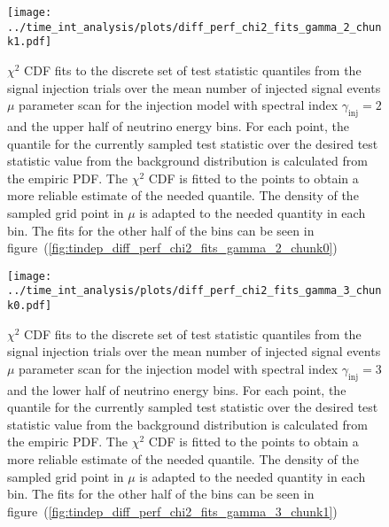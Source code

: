 \begin{figure}[H]
  \centering
  \texttt{[image: ../time\_int\_analysis/plots/diff\_perf\_chi2\_fits\_gamma\_2\_chunk1.pdf]}
  \caption[$\chi^2$ CDF fits for the time-integrated diff. performance, $\gamma_\text{inj}=2$ -- part 2]{
     $\chi^2$ CDF fits to the discrete set of test statistic quantiles from the signal injection trials over the mean number of injected signal events $\mu$ parameter scan for the injection model with spectral index $\gamma_\text{inj}=2$ and the upper half of neutrino energy bins.
     For each point, the quantile for the currently sampled test statistic over the desired test statistic value from the background distribution is calculated from the empiric PDF.
     The $\chi^2$ CDF is fitted to the points to obtain a more reliable estimate of the needed quantile.
     The density of the sampled grid point in $\mu$ is adapted to the needed quantity in each bin.
     The fits for the other half of the bins can be seen in figure~(\ref{fig:tindep_diff_perf_chi2_fits_gamma_2_chunk0})
  }
  \label{fig:tindep_diff_perf_chi2_fits_gamma_2_chunk1}
\end{figure}

\begin{figure}[H]
  \centering
  \texttt{[image: ../time\_int\_analysis/plots/diff\_perf\_chi2\_fits\_gamma\_3\_chunk0.pdf]}
  \caption[$\chi^2$ CDF fits for the time-integrated diff. performance, $\gamma_\text{inj}=3$ -- part 1]{
     $\chi^2$ CDF fits to the discrete set of test statistic quantiles from the signal injection trials over the mean number of injected signal events $\mu$ parameter scan for the injection model with spectral index $\gamma_\text{inj}=3$ and the lower half of neutrino energy bins.
     For each point, the quantile for the currently sampled test statistic over the desired test statistic value from the background distribution is calculated from the empiric PDF.
     The $\chi^2$ CDF is fitted to the points to obtain a more reliable estimate of the needed quantile.
     The density of the sampled grid point in $\mu$ is adapted to the needed quantity in each bin.
     The fits for the other half of the bins can be seen in figure~(\ref{fig:tindep_diff_perf_chi2_fits_gamma_3_chunk1})
  }
  \label{fig:tindep_diff_perf_chi2_fits_gamma_3_chunk0}
\end{figure}

